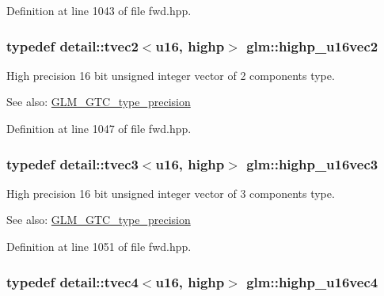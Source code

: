 Definition at line 1043 of file fwd.hpp.\hypertarget{group__gtc__type__precision_gfad4245d389a4990eb505cd74a2d0a6f}{
\subsubsection[highp\_\-u16vec2]{\setlength{\rightskip}{0pt plus 5cm}typedef detail::tvec2$<$u16, highp$>$ {\bf glm::highp\_\-u16vec2}}}
\label{group__gtc__type__precision_gfad4245d389a4990eb505cd74a2d0a6f}


High precision 16 bit unsigned integer vector of 2 components type. \begin{Desc}
\item[See also:]\hyperlink{group__gtc__type__precision}{GLM\_\-GTC\_\-type\_\-precision} \end{Desc}


Definition at line 1047 of file fwd.hpp.\hypertarget{group__gtc__type__precision_gd98b30ad9bbfb79233340be3ba53ceb6}{
\subsubsection[highp\_\-u16vec3]{\setlength{\rightskip}{0pt plus 5cm}typedef detail::tvec3$<$u16, highp$>$ {\bf glm::highp\_\-u16vec3}}}
\label{group__gtc__type__precision_gd98b30ad9bbfb79233340be3ba53ceb6}


High precision 16 bit unsigned integer vector of 3 components type. \begin{Desc}
\item[See also:]\hyperlink{group__gtc__type__precision}{GLM\_\-GTC\_\-type\_\-precision} \end{Desc}


Definition at line 1051 of file fwd.hpp.\hypertarget{group__gtc__type__precision_g89074b108ec0643cffdfd008bedd3ffb}{
\subsubsection[highp\_\-u16vec4]{\setlength{\rightskip}{0pt plus 5cm}typedef detail::tvec4$<$u16, highp$>$ {\bf glm::highp\_\-u16vec4}}}
\label{group__gtc__type__precision_g89074b108ec0643cffdfd008bedd3ffb}


